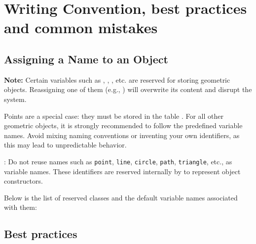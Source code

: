 \newpage

\section{Writing Convention, best practices and common mistakes}
\subsection{Assigning a Name to an Object}

\textbf{Note:} Certain variables such as , , , etc. are reserved for storing geometric objects.
Reassigning one of them (e.g., ) will overwrite its content and disrupt the system.

Points are a special case: they must be stored in the table .
For all other geometric objects, it is strongly recommended to follow the predefined variable names.
Avoid mixing naming conventions or inventing your own identifiers, as this may lead to unpredictable behavior.

\vspace{1em}
\tkzRHand{\textcolor{red}{Warning}}: Do not reuse names such as \texttt{point}, \texttt{line}, \texttt{circle}, \texttt{path}, \texttt{triangle}, etc., as variable names.
These identifiers are reserved internally by  to represent object constructors.

\vspace{1em}
Below is the list of reserved classes and the default variable names associated with them:
\label{list of reserved classes}

\vspace{1em}
\textcolor{red}{ }

\subsection{Best practices}

